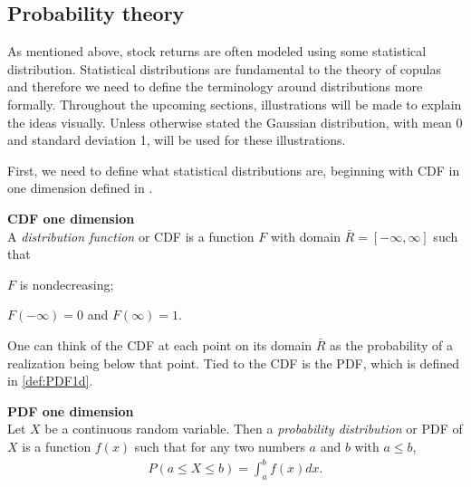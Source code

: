 
\subsection{Probability theory}
As mentioned above, stock returns are often modeled using some statistical distribution. Statistical distributions are fundamental to the theory of copulas and therefore we need to define the terminology around distributions more formally. Throughout the upcoming sections, illustrations will be made to explain the ideas visually. Unless otherwise stated the Gaussian distribution, with mean 0 and standard deviation 1, will be used for these illustrations.

First, we need to define what statistical distributions are, beginning with \gls{CDF} in one dimension defined in .


\begin{definition}\label{def:CDF1d} \textbf{CDF one dimension }  \citet[p.~17]{Nelsen2006}\\
    A \emph{distribution function} or \gls{CDF} is a function $F$ with domain $\bar{R} = [-\infty, \infty]$ such that 
    \begin{compactenum}
        \item $F$ is nondecreasing; 
        \item $F(-\infty)=0$ and $F(\infty)=1$.
    \end{compactenum}
\end{definition}

One can think of the \gls{CDF} at each point on its domain $\bar{R}$ as the probability of a realization being below that point. Tied to the \gls{CDF} is the \gls{PDF}, which is defined in \cref{def:PDF1d}.

\begin{definition}\label{def:PDF1d} \textbf{PDF one dimension} \citet[pp.~160-161]{DevoreBerk2012}\\
    Let $X$ be a continuous random variable. Then a \emph{probability distribution} or \gls{PDF} of $X$ is a function $f(x)$ such that for any two numbers $a$ and $b$ with $a \leq  b$,
        \begin{align*}
            P(a \leq X \leq b) = \int_a^bf(x)dx.\\
        \end{align*}
\end{definition}

